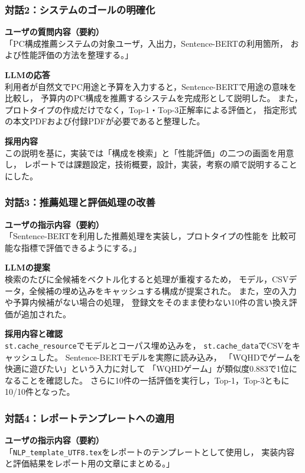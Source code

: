 \documentclass[a4paper,11pt]{article}
\begin{document}
\subsubsection*{対話2：システムのゴールの明確化}
\noindent
\textbf{ユーザの質問内容（要約）}\\
「PC構成推薦システムの対象ユーザ，入出力，Sentence-BERTの利用箇所，
および性能評価の方法を整理する。」

\noindent
\textbf{LLMの応答}\\
利用者が自然文でPC用途と予算を入力すると，Sentence-BERTで用途の意味を比較し，
予算内のPC構成を推薦するシステムを完成形として説明した。
また，プロトタイプの作成だけでなく，Top-1・Top-3正解率による評価と，
指定形式の本文PDFおよび付録PDFが必要であると整理した。

\noindent
\textbf{採用内容}\\
この説明を基に，実装では「構成を検索」と「性能評価」の二つの画面を用意し，
レポートでは課題設定，技術概要，設計，実装，考察の順で説明することにした。

\subsubsection*{対話3：推薦処理と評価処理の改善}
\noindent
\textbf{ユーザの指示内容（要約）}\\
「Sentence-BERTを利用した推薦処理を実装し，プロトタイプの性能を
比較可能な指標で評価できるようにする。」

\noindent
\textbf{LLMの提案}\\
検索のたびに全候補をベクトル化すると処理が重複するため，
モデル，CSVデータ，全候補の埋め込みをキャッシュする構成が提案された。
また，空の入力や予算内候補がない場合の処理，
登録文をそのまま使わない10件の言い換え評価が追加された。

\noindent
\textbf{採用内容と確認}\\
\verb|st.cache_resource|でモデルとコーパス埋め込みを，
\verb|st.cache_data|でCSVをキャッシュした。
Sentence-BERTモデルを実際に読み込み，
「WQHDでゲームを快適に遊びたい」という入力に対して
「WQHDゲーム」が類似度0.883で1位になることを確認した。
さらに10件の一括評価を実行し，Top-1，Top-3ともに10/10件となった。

\subsubsection*{対話4：レポートテンプレートへの適用}
\noindent
\textbf{ユーザの指示内容（要約）}\\
「\verb|NLP_template_UTF8.tex|をレポートのテンプレートとして使用し，
実装内容と評価結果をレポート用の文章にまとめる。」
\end{document}
